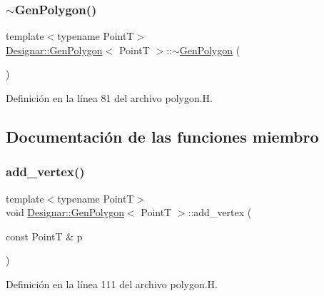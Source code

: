 \subsubsection{\texorpdfstring{$\sim$\+Gen\+Polygon()}{~GenPolygon()}}
{\footnotesize\ttfamily template$<$typename PointT$>$ \\
\hyperlink{class_designar_1_1_gen_polygon}{Designar\+::\+Gen\+Polygon}$<$ PointT $>$\+::$\sim$\hyperlink{class_designar_1_1_gen_polygon}{Gen\+Polygon} (\begin{DoxyParamCaption}{ }\end{DoxyParamCaption})\hspace{0.3cm}{\ttfamily [inline]}}



Definición en la línea 81 del archivo polygon.\+H.



\subsection{Documentación de las funciones miembro}
\mbox{\label{class_designar_1_1_gen_polygon_a3e059181e8c356f814bdf298da82f305}} 
\subsubsection{\texorpdfstring{add\+\_\+vertex()}{add\_vertex()}\hspace{0.1cm}{\footnotesize\ttfamily [1/2]}}
{\footnotesize\ttfamily template$<$typename PointT$>$ \\
void \hyperlink{class_designar_1_1_gen_polygon}{Designar\+::\+Gen\+Polygon}$<$ PointT $>$\+::add\+\_\+vertex (\begin{DoxyParamCaption}\item[{const PointT \&}]{p }\end{DoxyParamCaption})\hspace{0.3cm}{\ttfamily [inline]}}



Definición en la línea 111 del archivo polygon.\+H.

\mbox{\label{class_designar_1_1_gen_polygon_a0236ff66d05f2340c9412d5a6f5dc813}} 
